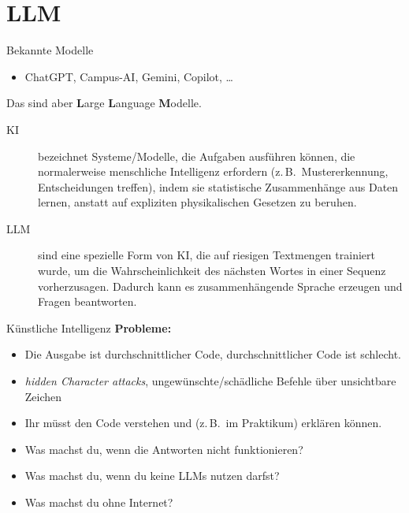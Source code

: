 \section{LLM}


\begin{frame}{Bekannte Modelle}
    \begin{itemize}
        \item ChatGPT, Campus-AI, Gemini, Copilot, \dots
    \end{itemize}
    Das sind aber \textbf{L}arge \textbf{L}anguage \textbf{M}odelle.
    \begin{description}
        \item[KI] bezeichnet Systeme/Modelle, die Aufgaben ausführen können,
            die normalerweise menschliche Intelligenz erfordern
            (z.\,B.\ Mustererkennung, Entscheidungen treffen),
            indem sie statistische Zusammenhänge aus Daten lernen,
            anstatt auf expliziten physikalischen Gesetzen zu beruhen. 
        \item[LLM] sind eine spezielle Form von KI, die auf riesigen Textmengen trainiert wurde,
            um die Wahrscheinlichkeit des nächsten Wortes in einer Sequenz vorherzusagen.
            Dadurch kann es zusammenhängende Sprache erzeugen und Fragen beantworten.
    \end{description}
\end{frame}

\begin{frame}{Künstliche Intelligenz}
    \textcolor{vertexDarkRed}{\textbf{Probleme:}}
    \begin{itemize}
        \item Die Ausgabe ist durchschnittlicher Code, durchschnittlicher Code ist schlecht.
        \item \textit{hidden Character attacks}, ungewünschte/schädliche Befehle über unsichtbare Zeichen
        \item Ihr müsst den Code verstehen und (z.\,B.\ im Praktikum) erklären können.
        \item Was machst du, wenn die Antworten nicht funktionieren?
        \item Was machst du, wenn du keine LLMs nutzen darfst?
        \item Was machst du ohne Internet?
    \end{itemize}
\end{frame}